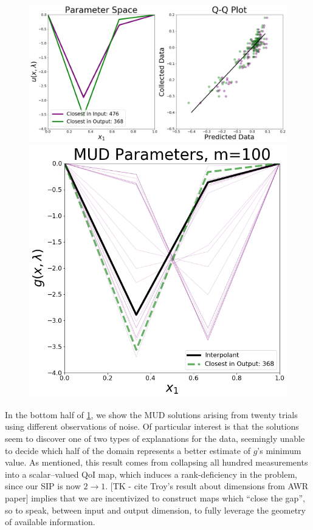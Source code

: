 \begin{figure}[htbp]
\centering
  \includegraphics[width=0.95\linewidth]{figures/pde-highd/pde-highd_proj_D2}
  \includegraphics[width=0.95\linewidth]{figures/pde-highd/pde-highd_pair_D2-1_m100}
\caption{
}
\label{fig:pde-highd-2d-scalar-mud}
\end{figure}

In the bottom half of \ref{fig:pde-highd-2d-scalar-mud}, we show the MUD solutions arising from twenty trials using different observations of noise.
Of particular interest is that the solutions seem to discover one of two types of explanations for the data, seemingly unable to decide which half of the domain represents a better estimate of $g$'s minimum value.
As mentioned, this result comes from collapsing all hundred measurements into a scalar--valued QoI map, which induces a rank-deficiency in the problem, since our SIP is now $2\rightarrow 1$.
[TK - cite Troy's result about dimensions from AWR paper] implies that we are incentivized to construct maps which ``close the gap'', so to speak, between input and output dimension, to fully leverage the geometry of available information.


